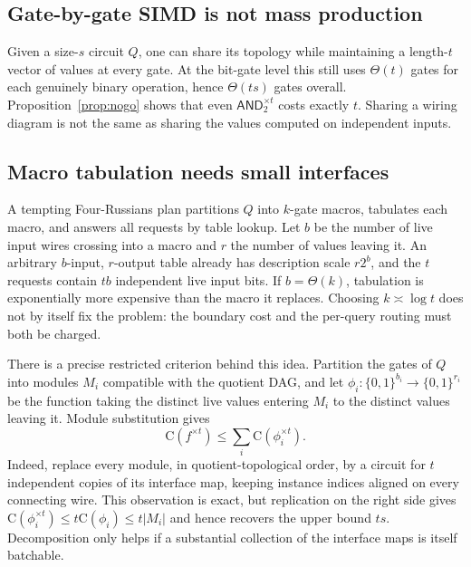 \documentclass[11pt]{article}
\theoremstyle{definition}
\newcommand{\bits}{\{0,1\}}
\newcommand{\C}{\mathrm{C}}
\begin{document}
\subsection{Gate-by-gate SIMD is not mass production}

Given a size-$s$ circuit $Q$, one can share its topology while maintaining a
length-$t$ vector of values at every gate.  At the bit-gate level this still
uses $\Theta(t)$ gates for each genuinely binary operation, hence
$\Theta(ts)$ gates overall.  Proposition~\ref{prop:nogo} shows that even
$\mathsf{AND}_2^{\times t}$ costs exactly $t$.  Sharing a wiring diagram is
not the same as sharing the values computed on independent inputs.

\subsection{Macro tabulation needs small interfaces}

A tempting Four-Russians plan partitions $Q$ into $k$-gate macros, tabulates
each macro, and answers all requests by table lookup.  Let $b$ be the number
of live input wires crossing into a macro and $r$ the number of values leaving
it.  An arbitrary $b$-input, $r$-output table already has description scale
$r2^b$, and the $t$ requests contain $tb$ independent live input bits.  If
$b=\Theta(k)$, tabulation is exponentially more expensive than the macro it
replaces.  Choosing $k\asymp\log t$ does not by itself fix the problem: the
boundary cost and the per-query routing must both be charged.

There is a precise restricted criterion behind this idea.  Partition the
gates of $Q$ into modules $M_i$ compatible with the quotient DAG, and let
$\phi_i:\bits^{b_i}\to\bits^{r_i}$ be the function taking the distinct live
values entering $M_i$ to the distinct values leaving it.  Module substitution
gives
\begin{equation}
  \C(f^{\times t})\le\sum_i\C(\phi_i^{\times t}).
  \label{eq:module-substitution}
\end{equation}
Indeed, replace every module, in quotient-topological order, by a circuit for
$t$ independent copies of its interface map, keeping instance indices aligned
on every connecting wire.  This observation is exact, but replication on the
right side gives
$\C(\phi_i^{\times t})\le t\C(\phi_i)\le t|M_i|$ and hence recovers the
upper bound $ts$.  Decomposition only helps if a
substantial collection of the interface maps is itself batchable.
\end{document}
